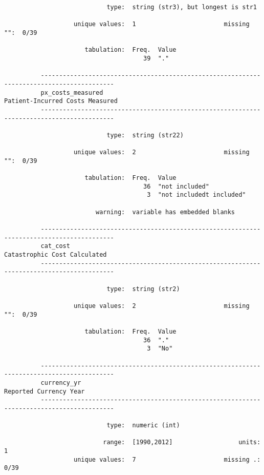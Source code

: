 \documentclass{article}
\begin{document}
\begin{verbatim}
                            type:  string (str3), but longest is str1
          
                   unique values:  1                        missing "":  0/39
          
                      tabulation:  Freq.  Value
                                      39  "."
          
          ------------------------------------------------------------------------------------------
          px_costs_measured                                          Patient-Incurred Costs Measured
          ------------------------------------------------------------------------------------------
          
                            type:  string (str22)
          
                   unique values:  2                        missing "":  0/39
          
                      tabulation:  Freq.  Value
                                      36  "not included"
                                       3  "not includedt included"
          
                         warning:  variable has embedded blanks
          
          ------------------------------------------------------------------------------------------
          cat_cost                                                      Catastrophic Cost Calculated
          ------------------------------------------------------------------------------------------
          
                            type:  string (str2)
          
                   unique values:  2                        missing "":  0/39
          
                      tabulation:  Freq.  Value
                                      36  "."
                                       3  "No"
          
          ------------------------------------------------------------------------------------------
          currency_yr                                                         Reported Currency Year
          ------------------------------------------------------------------------------------------
          
                            type:  numeric (int)
          
                           range:  [1990,2012]                  units:  1
                   unique values:  7                        missing .:  0/39
          

\end{verbatim}
\end{document}
